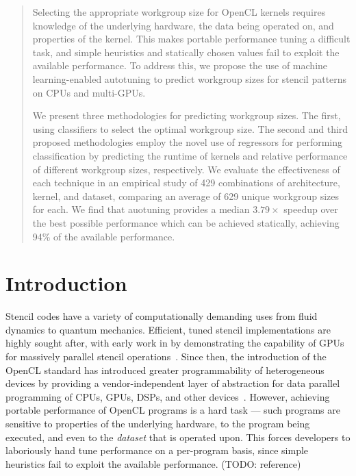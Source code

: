 \documentclass[preprint,nonatbib,10pt]{sigplanconf}
\begin{document}
\begin{abstract}
  Selecting the appropriate workgroup size for OpenCL kernels requires
  knowledge of the underlying hardware, the data being operated on,
  and properties of the kernel. This makes portable performance tuning
  a difficult task, and simple heuristics and statically chosen values
  fail to exploit the available performance. To address this, we
  propose the use of machine learning-enabled autotuning to predict
  workgroup sizes for stencil patterns on CPUs and multi-GPUs.

  We present three methodologies for predicting workgroup sizes. The
  first, using classifiers to select the optimal workgroup size. The
  second and third proposed methodologies employ the novel use of
  regressors for performing classification by predicting the runtime
  of kernels and relative performance of different workgroup sizes,
  respectively. We evaluate the effectiveness of each technique in an
  empirical study of 429 combinations of architecture, kernel, and
  dataset, comparing an average of 629 unique workgroup sizes for
  each. We find that auotuning provides a median $3.79\times$ speedup
  over the best possible performance which can be achieved statically,
  achieving 94\% of the available performance.
\end{abstract}




\section{Introduction}\label{sec:introduction}

Stencil codes have a variety of computationally demanding uses from
fluid dynamics to quantum mechanics. Efficient, tuned stencil
implementations are highly sought after, with early work in
\citeyear{Bolz2003} by \citeauthor{Bolz2003} demonstrating the
capability of GPUs for massively parallel stencil
operations~\cite{Bolz2003}. Since then, the introduction of the OpenCL
standard has introduced greater programmability of heterogeneous
devices by providing a vendor-independent layer of abstraction for
data parallel programming of CPUs, GPUs, DSPs, and other
devices~\cite{Stone2010}. However, achieving portable performance of
OpenCL programs is a hard task --- such programs are sensitive to
properties of the underlying hardware, to the program being executed,
and even to the \emph{dataset} that is operated upon. This forces
developers to laboriously hand tune performance on a per-program
basis, since simple heuristics fail to exploit the available
performance. (TODO: reference)
\end{document}

